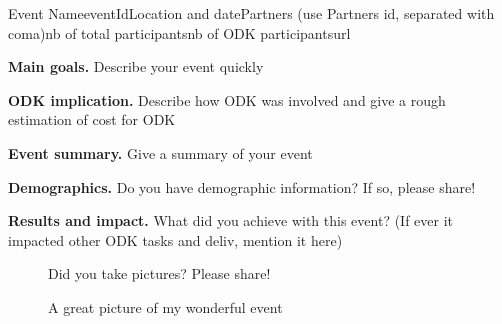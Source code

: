 \begin{event}{Event Name}{eventId}{Location and date}{Partners (use Partners id, separated with coma)}{nb of total participants}{nb of ODK participants}{url}

\textbf{Main goals.} Describe your event quickly

\textbf{ODK implication.} Describe how ODK was involved and give a rough estimation of cost for ODK

\textbf{Event summary.} Give a summary of your event

\textbf{Demographics.} Do you have demographic information? If so, please share!

\textbf{Results and impact.} What did you achieve with this event? (If ever it impacted 
other ODK tasks and deliv, mention it here)

\begin{figure}[ht]
\caption*{A great picture of my wonderful event}
Did you take pictures? Please share!
\end{figure}



\end{event}
